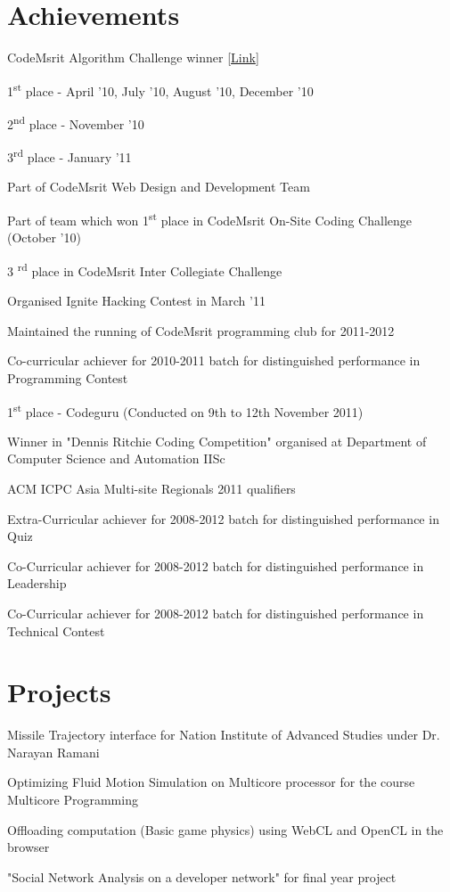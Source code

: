 \begin{resume}
\section{\sc Achievements }
\begin{list2}
 \item CodeMsrit Algorithm Challenge winner [\href{http://www.code.vrglinug.org/results.php}{Link}] 
\begin{list2}
  \item 1\textsuperscript{st} place -  April '10, July '10, August '10, December '10   
  \item 2\textsuperscript{nd} place - November '10
  \item 3\textsuperscript{rd} place - January '11
\end{list2}
 \item Part of CodeMsrit Web Design and Development Team
 \item Part of team which won 1\textsuperscript{st} place in CodeMsrit On-Site Coding Challenge (October '10)
 \item 3 \textsuperscript{rd} place in CodeMsrit Inter Collegiate Challenge 
 \item Organised Ignite Hacking Contest in March '11
 \item Maintained the running of CodeMsrit programming club for 2011-2012
 \item Co-curricular achiever for 2010-2011 batch for distinguished performance in Programming Contest
 \item 1\textsuperscript{st} place - Codeguru (Conducted on 9th to 12th November 2011)
 \item Winner in "Dennis Ritchie Coding Competition" organised at Department of Computer Science and Automation IISc
 \item ACM ICPC Asia Multi-site Regionals 2011 qualifiers
 \item Extra-Curricular achiever for 2008-2012 batch for distinguished performance in Quiz
 \item Co-Curricular achiever for 2008-2012 batch for distinguished performance in Leadership
 \item Co-Curricular achiever for 2008-2012 batch for distinguished performance in Technical Contest
 \end{list2}

\section{\sc Projects}
\begin{list2}
\item Missile Trajectory interface for Nation Institute of Advanced Studies under Dr. Narayan Ramani
\item Optimizing Fluid Motion Simulation on Multicore processor for the course Multicore Programming
\item Offloading computation (Basic game physics) using WebCL and OpenCL in the browser
\item "Social Network Analysis on a developer network" for final year project
 \end{list2}
\end{resume}

